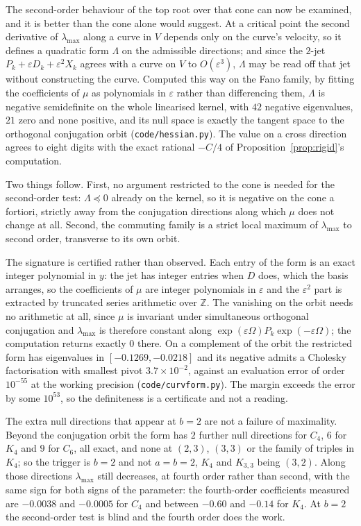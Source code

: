 \documentclass[11pt]{article}
\theoremstyle{remark}
\begin{document}
The second-order behaviour of the top root over that cone can now be examined, and it is better
than the cone alone would suggest. At a critical point the second derivative of $\lambda_{\max}$
along a curve in $V$ depends only on the curve's velocity, so it defines a quadratic form $\Lambda$
on the admissible directions; and since the $2$-jet $P_k+\varepsilon D_k+\varepsilon^2X_k$ agrees
with a curve on $V$ to $O(\varepsilon^3)$, $\Lambda$ may be read off that jet without constructing
the curve. Computed this way on the Fano family, by fitting the coefficients of $\mu$ as
polynomials in $\varepsilon$ rather than differencing them, $\Lambda$ is negative semidefinite on
the whole linearised kernel, with $42$ negative eigenvalues, $21$ zero and none positive, and its
null space is exactly the tangent space to the orthogonal conjugation orbit
(\texttt{code/hessian.py}). The value on a cross direction agrees to eight digits with the exact
rational $-C/4$ of Proposition~\ref{prop:rigid}'s computation.

Two things follow. First, no argument restricted to the cone is needed for the second-order test:
$\Lambda\preceq0$ already on the kernel, so it is negative on the cone a fortiori, strictly away
from the conjugation directions along which $\mu$ does not change at all. Second, the commuting
family is a strict local maximum of $\lambda_{\max}$ to second order, transverse to its own orbit.

The signature is certified rather than observed. Each entry of the form is an exact integer
polynomial in $y$: the jet has integer entries when $D$ does, which the basis arranges, so the
coefficients of $\mu$ are integer polynomials in $\varepsilon$ and the $\varepsilon^2$ part is
extracted by truncated series arithmetic over $\mathbb Z$. The vanishing on the orbit needs no
arithmetic at all, since $\mu$ is invariant under simultaneous orthogonal conjugation and
$\lambda_{\max}$ is therefore constant along $\exp(\varepsilon\Omega)P_k\exp(-\varepsilon\Omega)$;
the computation returns exactly $0$ there. On a complement of the orbit the restricted form has
eigenvalues in $[-0.1269,-0.0218]$ and its negative admits a Cholesky factorisation with smallest
pivot $3.7\times10^{-2}$, against an evaluation error of order $10^{-55}$ at the working precision
(\texttt{code/curvform.py}). The margin exceeds the error by some $10^{53}$, so the definiteness
is a certificate and not a reading.

The extra null directions that appear at $b=2$ are not a failure of maximality. Beyond the
conjugation orbit the form has $2$ further null directions for $C_4$, $6$ for $K_4$ and $9$ for
$C_6$, all exact, and none at $(2,3)$, $(3,3)$ or the family of triples in $K_4$; so the trigger is
$b=2$ and not $a=b=2$, $K_4$ and $K_{3,3}$ being $(3,2)$. Along those directions
$\lambda_{\max}$ still decreases, at fourth order rather than second, with the same sign for both
signs of the parameter: the fourth-order coefficients measured are $-0.0038$ and $-0.0005$ for
$C_4$ and between $-0.60$ and $-0.14$ for $K_4$. At $b=2$ the second-order test is blind and the
fourth order does the work.
\end{document}
